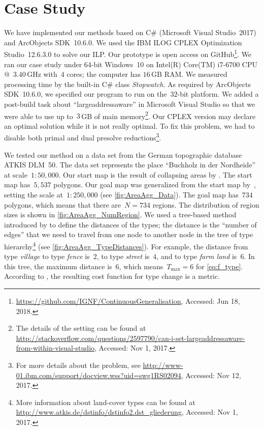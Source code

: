 \section{Case Study}
\label{sec:AreaAgg_CaseStudy}
We have implemented our methods 
based on C\# (Microsoft Visual Studio~2017) 
and ArcObjects SDK~10.6.0.
We used the IBM ILOG
CPLEX Optimization Studio~12.6.3.0 to solve our ILP.
Our prototype is open access on 
GitHub\footnote{
	\url{https://github.com/IGNF/ContinuousGeneralisation},
	Accessed: Jun 18, 2018.}.
We ran our case study
under 64-bit Windows~10 
on Intel(R) Core(TM) i7-6700 CPU @~$3.40\,$GHz with~$4$ cores;
the computer has $16\,$GB RAM.
We measured processing time 
by the built-in C\# class \emph{Stopwatch}.
As required by ArcObjects SDK~10.6.0,
we specified our program to run on the~$32$-bit platform. 
We added a post-build task about ``largeaddressaware''
in Microsoft Visual Studio so that 
we were able to use up to~$3\,$GB of main memory\footnote{
	The details of the setting can be found at 	
	\url{http://stackoverflow.com/questions/2597790/can-i-set-largeaddressaware-from-within-visual-studio},
	Accessed: Nov 1, 2017.}.
Our CPLEX version may declare an optimal solution
while it is not really optimal.
To fix this problem, we had to disable 
both primal and dual presolve reductions\footnote{
	For more details about the problem, see
	\url{http://www-01.ibm.com/support/docview.wss?uid=swg1RS02094},
	Accessed: Nov 12, 2017.}.

We tested our method on a data set 
from the German topographic database ATKIS DLM~50. 
The data set represents the place 
``Buchholz in der Nordheide'' at scale~$1:50{,}000$. 
Our start map is the result of collapsing areas 
by \citet[\chap~6]{haunert2008f}.
The start map has~$5{,}537$ polygons. 
Our goal map was generalized from the start map 
by~\citet{HaunertWolff2010AreaAgg}, setting the scale 
at~$1:250{,}000$ (see \fig\ref{fig:AreaAgg_Data}). 
The goal map has~$734$ polygons, 
which means that there are~$N=734$ regions.
The distribution of region sizes is shown in \fig\ref{fig:AreaAgg_NumRegion}.
%
We used a tree-based method introduced by 
\citet{Rada1989SemanticMetric} 
to define the distances of the types;
the distance is the ``number of edges'' that
we need to travel from one node to another 
node in the tree of type hierarchy\footnote{
	More information about land-cover types can be found at 
	\url{http://www.atkis.de/dstinfo/dstinfo2.dst_gliederung},
	Accessed: Nov 1, 2017.}
(see \fig\ref{fig:AreaAgg_TypeDistances}). 
For example, the distance from type \emph{village}
to type \emph{fence} is~$2$, 
to type \emph{street} is~$4$, and
to type \emph{farm land} is~$6$.
In this tree, the maximum distance is~$6$, 
which means~$T_\mathrm{max}=6$ for \eq\ref{eq:f_type}.
According to \citet{Rada1989SemanticMetric}, 
the resulting cost function for type change is a metric.


